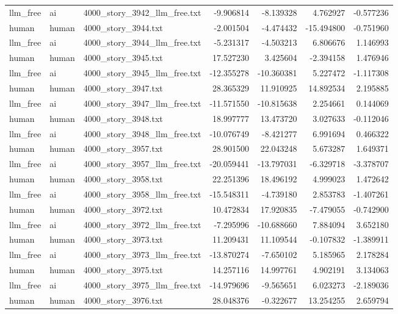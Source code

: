 \begin{longtable}{lllrrrr}
llm\_free & ai & 4000\_story\_3942\_llm\_free.txt & -9.906814 & -8.139328 & 4.762927 & -0.577236 \\
human & human & 4000\_story\_3944.txt & -2.001504 & -4.474432 & -15.494800 & -0.751960 \\
llm\_free & ai & 4000\_story\_3944\_llm\_free.txt & -5.231317 & -4.503213 & 6.806676 & 1.146993 \\
human & human & 4000\_story\_3945.txt & 17.527230 & 3.425604 & -2.394158 & 1.476946 \\
llm\_free & ai & 4000\_story\_3945\_llm\_free.txt & -12.355278 & -10.360381 & 5.227472 & -1.117308 \\
human & human & 4000\_story\_3947.txt & 28.365329 & 11.910925 & 14.892534 & 2.195885 \\
llm\_free & ai & 4000\_story\_3947\_llm\_free.txt & -11.571550 & -10.815638 & 2.254661 & 0.144069 \\
human & human & 4000\_story\_3948.txt & 18.997777 & 13.473720 & 3.027633 & -0.112046 \\
llm\_free & ai & 4000\_story\_3948\_llm\_free.txt & -10.076749 & -8.421277 & 6.991694 & 0.466322 \\
human & human & 4000\_story\_3957.txt & 28.901500 & 22.043248 & 5.673287 & 1.649371 \\
llm\_free & ai & 4000\_story\_3957\_llm\_free.txt & -20.059441 & -13.797031 & -6.329718 & -3.378707 \\
human & human & 4000\_story\_3958.txt & 22.251396 & 18.496192 & 4.999023 & 1.472642 \\
llm\_free & ai & 4000\_story\_3958\_llm\_free.txt & -15.548311 & -4.739180 & 2.853783 & -1.407261 \\
human & human & 4000\_story\_3972.txt & 10.472834 & 17.920835 & -7.479055 & -0.742900 \\
llm\_free & ai & 4000\_story\_3972\_llm\_free.txt & -7.295996 & -10.688660 & 7.884094 & 3.652180 \\
human & human & 4000\_story\_3973.txt & 11.209431 & 11.109544 & -0.107832 & -1.389911 \\
llm\_free & ai & 4000\_story\_3973\_llm\_free.txt & -13.870274 & -7.650102 & 5.185965 & 2.178284 \\
human & human & 4000\_story\_3975.txt & 14.257116 & 14.997761 & 4.902191 & 3.134063 \\
llm\_free & ai & 4000\_story\_3975\_llm\_free.txt & -14.979696 & -9.565651 & 6.023273 & -2.189036 \\
human & human & 4000\_story\_3976.txt & 28.048376 & -0.322677 & 13.254255 & 2.659794 \\

\end{longtable}
